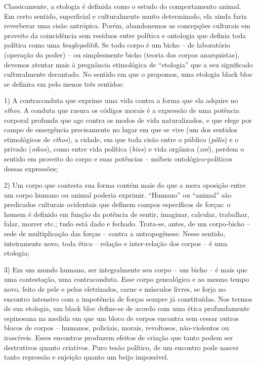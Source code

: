 Classicamente, a etologia é definida como o estudo do comportamento
animal. Em certo sentido, superficial e culturalmente muito determinado,
ela ainda faria reverberar uma cisão antrópica. Porém, abandonemos as
concepções culturais em proveito da coincidência sem resíduos entre
política e ontologia que definia toda política como uma
\emph{beaglepolitik}. Se todo corpo é um bicho -- de laboratório
(operação do poder) -- ou simplesmente bicho (teoria dos corpos
anarquistas), devemos atentar mais à pregnância etimológica de
``etologia'' que a seu significado culturalmente decantado. No sentido
em que o propomos, uma etologia black bloc se definira em pelo menos
três sentidos:

1) A contraconduta que exprime uma vida contra a forma que ela adquire
no \emph{ethos}. A conduta que rasura os códigos morais é a expressão de
uma potência corporal profunda que age contra os modos de vida
naturalizados, e que elege por campo de emergência precisamente no lugar
em que se vive (um dos sentidos etimológicos de \emph{ethos}), a cidade,
em que toda cisão entre o público (\emph{pólis}) e o privado
(\emph{oikos}), como entre vida política (\emph{bios}) e vida orgânica
(\emph{zoé}), perdem o sentido em proveito do corpo e suas potências --
móbeis ontológico-políticos dessas expressões;

2) Um corpo que contesta sua forma contém mais do que a mera oposição
entre um corpo humano ou animal poderia exprimir. ``Humano'' ou
``animal'' são predicados culturais ocidentais que definem campos
específicos de forças: o homem é definido em função da potência de
sentir, imaginar, calcular, trabalhar, falar, morrer etc.; tudo está
dado e fechado. Trata-se, antes, de um corpo-bicho -- sede de
multiplicação das forças -- contra a antropogênese. Nesse sentido,
inteiramente novo, toda ética -- relação e inter-relação dos corpos -- é
uma etologia;

3) Em um mundo humano, ser integralmente seu corpo -- um bicho -- é mais
que uma contestação, uma contraconduta. Esse corpo genealógico e ao
mesmo tempo novo, feito de pele e pelos eletrizados, carne e músculos
livres, se forja no encontro intensivo com a impotência de forças sempre
já constituídas. Nos termos de sua etologia, um black bloc define-se de
acordo com uma ética profundamente espinosana na medida em que um bloco
de corpos encontra sem cessar outros blocos de corpos -- humanos,
policiais, morais, revoltosos, não-violentos ou irascíveis. Esses
encontros produzem efeitos de criação que tanto podem ser destrutivos
quanto criativos. Puro tesão político, de um encontro pode nascer tanto
repressão e sujeição quanto um beijo impossível.

